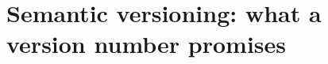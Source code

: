 \chapter{Semantic versioning: what a version number promises}
\label{ch:semantic-versioning-what-a-version}

